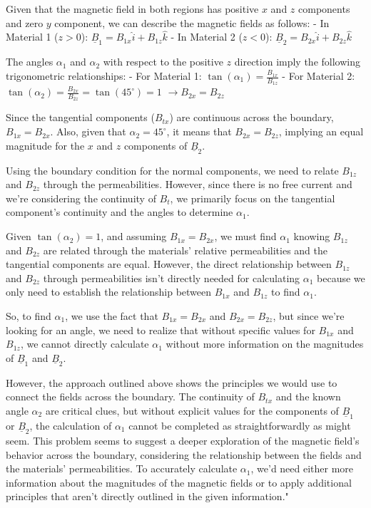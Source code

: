 Given that the magnetic field in both regions has positive \(x\) and \(z\) components and zero \(y\) component, we can describe the magnetic fields as follows:
- In Material 1 (\(z > 0\)): \( \underline{B}_{1} = B_{1x} \hat{i} + B_{1z} \hat{k} \)
- In Material 2 (\(z < 0\)): \( \underline{B}_{2} = B_{2x} \hat{i} + B_{2z} \hat{k} \)

The angles \( \alpha_{1} \) and \( \alpha_{2} \) with respect to the positive \(z\) direction imply the following trigonometric relationships:
- For Material 1: \( \tan(\alpha_{1}) = \frac{B_{1x}}{B_{1z}} \)
- For Material 2: \( \tan(\alpha_{2}) = \frac{B_{2x}}{B_{2z}} = \tan(45^\circ) = 1 \) \( \rightarrow B_{2x} = B_{2z} \)

Since the tangential components (\(B_{tx}\)) are continuous across the boundary, \( B_{1x} = B_{2x} \). Also, given that \( \alpha_{2} = 45^\circ \), it means that \( B_{2x} = B_{2z} \), implying an equal magnitude for the \(x\) and \(z\) components of \( \underline{B}_{2} \).

Using the boundary condition for the normal components, we need to relate \(B_{1z}\) and \(B_{2z}\) through the permeabilities. However, since there is no free current and we're considering the continuity of \(B_{t}\), we primarily focus on the tangential component's continuity and the angles to determine \( \alpha_{1} \).

Given \( \tan(\alpha_{2}) = 1 \), and assuming \(B_{1x} = B_{2x}\), we must find \( \alpha_{1} \) knowing \(B_{1z}\) and \(B_{2z}\) are related through the materials' relative permeabilities and the tangential components are equal. However, the direct relationship between \(B_{1z}\) and \(B_{2z}\) through permeabilities isn't directly needed for calculating \( \alpha_{1} \) because we only need to establish the relationship between \(B_{1x}\) and \(B_{1z}\) to find \( \alpha_{1} \).

So, to find \( \alpha_{1} \), we use the fact that \(B_{1x} = B_{2x}\) and \(B_{2x} = B_{2z}\), but since we're looking for an angle, we need to realize that without specific values for \(B_{1x}\) and \(B_{1z}\), we cannot directly calculate \( \alpha_{1} \) without more information on the magnitudes of \( \underline{B}_{1} \) and \( \underline{B}_{2} \).

However, the approach outlined above shows the principles we would use to connect the fields across the boundary. The continuity of \(B_{tx}\) and the known angle \( \alpha_{2} \) are critical clues, but without explicit values for the components of \( \underline{B}_{1} \) or \( \underline{B}_{2} \), the calculation of \( \alpha_{1} \) cannot be completed as straightforwardly as might seem. This problem seems to suggest a deeper exploration of the magnetic field's behavior across the boundary, considering the relationship between the fields and the materials' permeabilities. To accurately calculate \( \alpha_{1} \), we'd need either more information about the magnitudes of the magnetic fields or to apply additional principles that aren't directly outlined in the given information."


